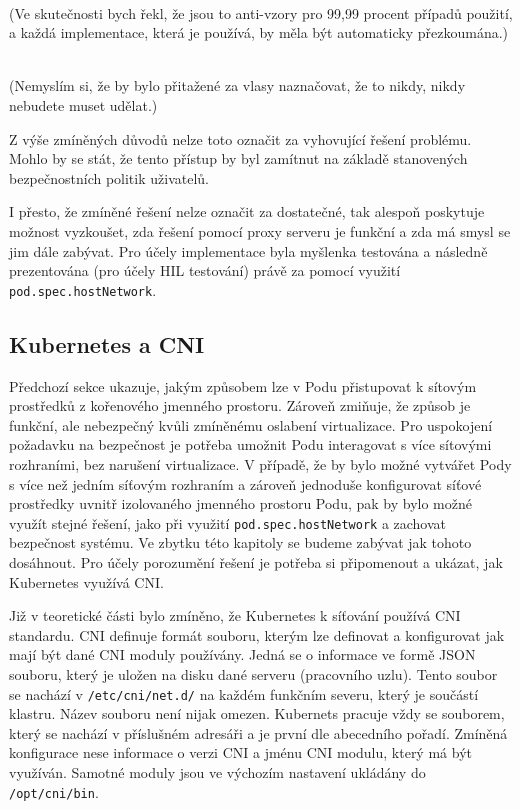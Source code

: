 \begin{displayquote}
\\(Ve skutečnosti bych řekl, že jsou to anti-vzory pro 99,99 procent případů použití, a každá implementace, která je používá, by měla být automaticky přezkoumána.) \cite{betz_2022_understanding} 

\\(Nemyslím si, že by bylo přitažené za vlasy naznačovat, že to nikdy, nikdy nebudete muset udělat.) \cite{betz_2022_understanding} 
\end{displayquote}


Z výše zmíněných důvodů nelze toto označit za vyhovující řešení problému. Mohlo by se stát, že tento přístup by byl zamítnut na základě stanovených bezpečnostních politik uživatelů.

I přesto, že zmíněné řešení nelze označit za dostatečné, tak alespoň poskytuje možnost vyzkoušet, zda řešení pomocí proxy serveru je funkční a zda má smysl se jim dále zabývat. Pro účely implementace byla myšlenka testována a následně prezentována (pro účely HIL testování) právě za pomocí využití \verb|pod.spec.hostNetwork|.

\subsection{Kubernetes a CNI}
Předchozí sekce ukazuje, jakým způsobem lze v Podu přistupovat k sítovým prostředků z kořenového jmenného prostoru. Zároveň zmiňuje, že způsob je funkční, ale nebezpečný kvůli zmíněnému oslabení virtualizace. Pro uspokojení požadavku na bezpečnost je potřeba umožnit Podu interagovat s více sítovými rozhraními, bez narušení virtualizace. V případě, že by bylo možné vytvářet Pody s více než jedním síťovým rozhraním a zároveň jednoduše konfigurovat síťové prostředky uvnitř izolovaného jmenného prostoru Podu, pak by bylo možné využít stejné řešení, jako při využití \verb|pod.spec.hostNetwork| a zachovat bezpečnost systému. Ve zbytku této kapitoly se budeme zabývat jak tohoto dosáhnout. Pro účely porozumění řešení je potřeba si připomenout a ukázat, jak Kubernetes využívá CNI.

Již v teoretické části bylo zmíněno, že Kubernetes k síťování používá CNI standardu. CNI definuje formát souboru, kterým lze definovat a konfigurovat jak mají být dané CNI moduly používány. Jedná se o informace ve formě JSON souboru, který je uložen na disku dané serveru (pracovního uzlu). Tento soubor se nachází v \verb|/etc/cni/net.d/| na každém funkčním severu, který je součástí klastru. Název souboru není nijak omezen. Kubernets pracuje vždy se souborem, který se nachází v příslušném adresáři a je první dle abecedního pořadí. Zmíněná konfigurace nese informace o verzi CNI a jménu CNI modulu, který má být využíván. Samotné moduly jsou ve výchozím nastavení ukládány do \verb|/opt/cni/bin|. 

